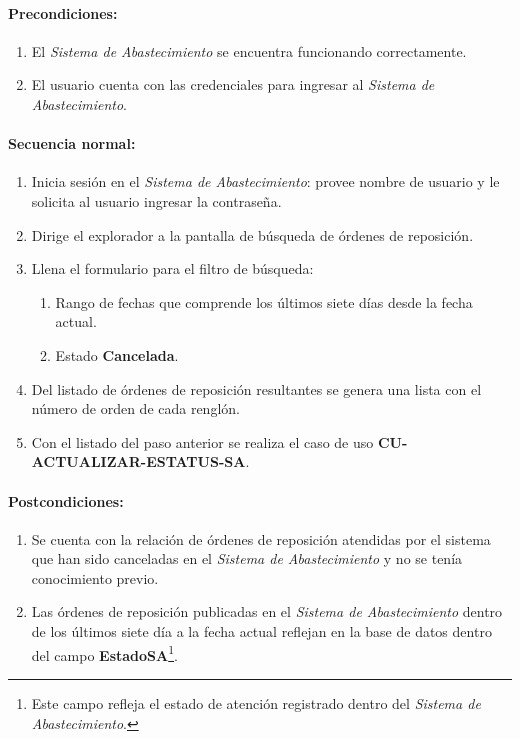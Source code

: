 \paragraph{Precondiciones:}
\begin{enumerate}
  \item El \textit{Sistema de Abastecimiento} se encuentra funcionando correctamente.
  \item El usuario cuenta con las credenciales para ingresar al \textit{Sistema de Abastecimiento}.
\end{enumerate}
\paragraph{Secuencia normal:}
\begin{enumerate}
  \item Inicia sesión en el \textit{Sistema de Abastecimiento}: provee nombre de usuario y le solicita al usuario ingresar la contraseña.
  \item Dirige el explorador a la pantalla de búsqueda de órdenes de reposición.
  \item Llena el formulario para el filtro de búsqueda:
  \begin{enumerate}
    \item Rango de fechas que comprende los últimos siete días desde la fecha actual.
    \item Estado \textbf{Cancelada}.
  \end{enumerate}
  \item Del listado de órdenes de reposición resultantes se genera una lista con el número de orden de cada renglón.
  \item Con el listado del paso anterior se realiza el caso de uso \textbf{CU-ACTUALIZAR-ESTATUS-SA}.
\end{enumerate}
\paragraph{Postcondiciones:}
\begin{enumerate}
  \item Se cuenta con la relación de órdenes de reposición atendidas por el sistema que han sido canceladas en el \textit{Sistema de Abastecimiento} y no se tenía conocimiento previo.
  \item Las órdenes de reposición publicadas en el \textit{Sistema de Abastecimiento} dentro de los últimos siete día a la fecha actual reflejan en la base de datos dentro del campo \textbf{EstadoSA}\footnote{Este campo refleja el estado de atención registrado dentro del \textit{Sistema de Abastecimiento}.}.
\end{enumerate}
